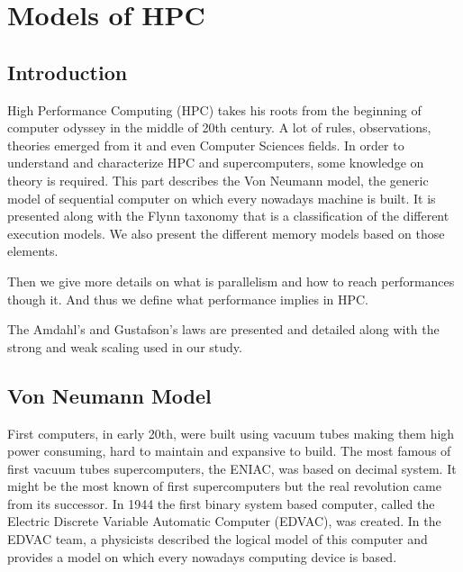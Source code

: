
\chapter{Models of HPC}

\section{Introduction}

High Performance Computing (HPC) takes his roots from the beginning of computer odyssey in the middle of 20th century.
A lot of rules, observations, theories emerged from it and even Computer Sciences fields. 
In order to understand and characterize HPC and supercomputers, some knowledge on theory is required. 
This part describes the Von Neumann model, the generic model of sequential computer on which every nowadays machine is built.
It is presented along with the Flynn taxonomy that is a classification of the different execution models. 
We also present the different memory models based on those elements. 

Then we give more details on what is parallelism and how to reach performances though it. 
And thus we define what performance implies in HPC. 

The Amdahl's and Gustafson's laws are presented and detailed along with the strong and weak scaling used in our study. 

\section{Von Neumann Model}
First computers, in early 20th, were built using vacuum tubes making them high power consuming, hard to maintain and expansive to build.
The most famous of first vacuum tubes supercomputers, the ENIAC, was based on decimal system.
It might be the most known of first supercomputers but the real revolution came from its successor.
In 1944 the first binary system based computer, called the Electric Discrete Variable Automatic Computer (EDVAC), was created. 
In the EDVAC team, a physicists described the logical model of this computer and provides a model on which every nowadays computing device is based. 

